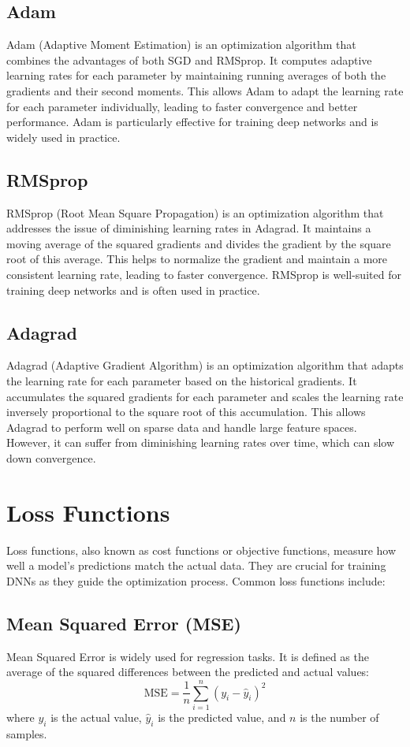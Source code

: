 \documentclass[12pt]{article}
\begin{document}
\subsection{Adam}
Adam (Adaptive Moment Estimation) is an optimization algorithm that combines the advantages of both SGD and RMSprop. It computes adaptive learning rates for each parameter by maintaining running averages of both the gradients and their second moments. This allows Adam to adapt the learning rate for each parameter individually, leading to faster convergence and better performance. Adam is particularly effective for training deep networks and is widely used in practice.

\subsection{RMSprop}
RMSprop (Root Mean Square Propagation) is an optimization algorithm that addresses the issue of diminishing learning rates in Adagrad. It maintains a moving average of the squared gradients and divides the gradient by the square root of this average. This helps to normalize the gradient and maintain a more consistent learning rate, leading to faster convergence. RMSprop is well-suited for training deep networks and is often used in practice.

\subsection{Adagrad}
Adagrad (Adaptive Gradient Algorithm) is an optimization algorithm that adapts the learning rate for each parameter based on the historical gradients. It accumulates the squared gradients for each parameter and scales the learning rate inversely proportional to the square root of this accumulation. This allows Adagrad to perform well on sparse data and handle large feature spaces. However, it can suffer from diminishing learning rates over time, which can slow down convergence.

\section{Loss Functions}
Loss functions, also known as cost functions or objective functions, measure how well a model's predictions match the actual data. They are crucial for training DNNs as they guide the optimization process. Common loss functions include:

\subsection{Mean Squared Error (MSE)}
Mean Squared Error is widely used for regression tasks. It is defined as the average of the squared differences between the predicted and actual values:
\[
\text{MSE} = \frac{1}{n} \sum_{i=1}^{n} (y_i - \hat{y}_i)^2
\]
where \( y_i \) is the actual value, \( \hat{y}_i \) is the predicted value, and \( n \) is the number of samples.
\end{document}
